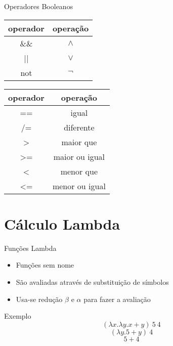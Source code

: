 \documentclass{beamer}
\begin{document}
	\begin{frame}{Operadores Booleanos}
	 
	 \begin{table}[h]
	  \begin{tabular}{c | c}
	  \hline
	   operador & operação\\
	   \hline
	   \&\& & $\land$ \\
	   || & $\lor$ \\
	   not & $\lnot$ \\
	   \hline
	  \end{tabular}
	 \end{table}
	 
	 \begin{table}[h]
	  \begin{tabular}{c | c}
	  \hline
	   operador & operação\\
	   \hline
	   == & igual \\
	   /= & diferente \\
	   > & maior que \\
	   >= & maior ou igual \\
	   < & menor que \\
	   <= & menor ou igual \\
	   \hline
	  \end{tabular}
	 \end{table} 
	\end{frame}
	
	\section{Cálculo Lambda}
	
		\begin{frame}{}
		\end{frame}

		\begin{frame}{Funções Lambda}
		 
		 \begin{itemize}
		  \item Funções sem nome
		  \item São avaliadas através de substituição de símbolos
		  \item Usa-se redução $\beta$ e $\alpha$ para fazer a avaliação
		 \end{itemize}
		 
		 \begin{block}{Exemplo}
		  \[(\lambda x. \lambda y. x+y)~ 5~ 4\]
		  \[(\lambda y. 5+y)~ 4\]
		  \[5+4\]		  
		 \end{block}		 
		\end{frame}
		
\end{document}
